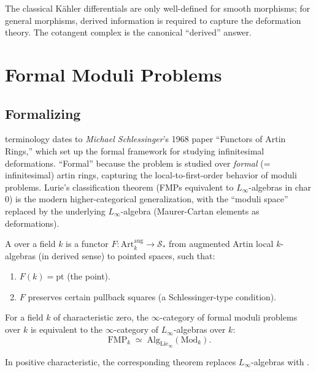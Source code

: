 \begin{remark}
The classical Kähler differentials are only well-defined for smooth
morphisms; for general morphisms, derived information is required to
capture the deformation theory. The cotangent complex is the canonical
``derived'' answer.
\end{remark}


\section{Formal Moduli Problems}
\label{sec:moduli}

\subsection{Formalizing}

\begin{nameorigin}
 terminology dates to \emph{Michael
Schlessinger}'s 1968 paper ``Functors of Artin Rings,'' which set up
the formal framework for studying infinitesimal deformations.
``Formal'' because the problem is studied over \emph{formal} (=
infinitesimal) artin rings, capturing the local-to-first-order behavior
of moduli problems. Lurie's classification theorem (FMPs equivalent to
$L_\infty$-algebras in char 0) is the modern higher-categorical
generalization, with the ``moduli space'' replaced by the underlying
$L_\infty$-algebra (Maurer-Cartan elements as deformations).
\end{nameorigin}

\begin{definition}
\label{def:formal-moduli}
A  over a field $k$ is a functor
$F : \mathrm{Art}_k^{\mathrm{aug}} \to \mathcal{S}_*$ from augmented
Artin local $k$-algebras (in derived sense) to pointed spaces, such that:
\begin{enumerate}
  \item $F(k) = \mathrm{pt}$ (the point).
  \item $F$ preserves certain pullback squares (a Schlessinger-type condition).
\end{enumerate}
\end{definition}

\begin{theorem}
\label{thm:lurie-fmp}
For a field $k$ of characteristic zero, the $\infty$-category of formal
moduli problems over $k$ is equivalent to the $\infty$-category of
$L_\infty$-algebras over $k$:
\begin{equation*}
  \mathrm{FMP}_k \;\simeq\; \mathrm{Alg}_{\mathrm{Lie}_\infty}(\mathrm{Mod}_k).
\end{equation*}

In positive characteristic, the corresponding theorem replaces
$L_\infty$-algebras with .
\end{theorem}

